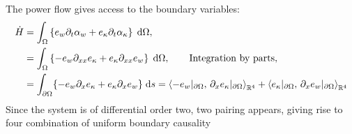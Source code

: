 The power flow gives access to the boundary variables:
\begin{equation}
\begin{aligned}
\dot{H} &= \int_{\Omega} \left\{e_w \partial_t \alpha_w + e_\kappa \partial_t \alpha_\kappa \right\}  \d{\Omega}, \\
&= \int_{\Omega} \left\{-e_w \partial_{xx}e_\kappa + e_\kappa \partial_{xx} e_w \right\} \d{\Omega}, \qquad \text{Integration by parts}, \\
&= \int_{\partial\Omega}\{-e_w \partial_{x}e_\kappa + e_\kappa \partial_{x} e_w \} \d{s}= \inner[\bbR^4]{-e_w\vert_{\partial\Omega}}{\partial_{x}e_\kappa\vert_{\partial\Omega}} + \inner[\bbR^4]{e_\kappa\vert_{\partial\Omega}}{\partial_{x}e_w\vert_{\partial\Omega}}
\end{aligned}
\end{equation}
Since the system is of differential order two, two pairing appears, giving rise to four combination of uniform boundary causality
